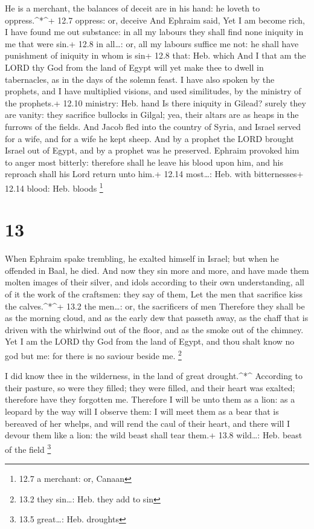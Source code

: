  He is a merchant, the balances of deceit are in his hand:
he loveth to oppress.\^{}*\^{}+ 12.7 oppress: or, deceive 
And Ephraim said, Yet I am become rich, I have found me out substance:
in all my labours they shall find none iniquity in me that were sin.+
12.8 in all\ldots: or, all my labours suffice me not: he shall have
punishment of iniquity in whom is sin+ 12.8 that: Heb. which
 And I that am the LORD thy God from the land of Egypt will
yet make thee to dwell in tabernacles, as in the days of the solemn
feast.  I have also spoken by the prophets, and I have
multiplied visions, and used similitudes, by the ministry of the
prophets.+ 12.10 ministry: Heb. hand  Is there iniquity in
Gilead? surely they are vanity: they sacrifice bullocks in Gilgal; yea,
their altars are as heaps in the furrows of the fields. 
And Jacob fled into the country of Syria, and Israel served for a wife,
and for a wife he kept sheep.  And by a prophet the LORD
brought Israel out of Egypt, and by a prophet was he preserved.
 Ephraim provoked him to anger most bitterly: therefore
shall he leave his blood upon him, and his reproach shall his Lord
return unto him.+ 12.14 most\ldots: Heb. with bitternesses+ 12.14 blood:
Heb. bloods \footnote{12.7 a merchant: or, Canaan}

\hypertarget{section-12}{%
\section{13}\label{section-12}}

 When Ephraim spake trembling, he exalted himself in Israel;
but when he offended in Baal, he died.  And now they sin
more and more, and have made them molten images of their silver, and
idols according to their own understanding, all of it the work of the
craftsmen: they say of them, Let the men that sacrifice kiss the
calves.\^{}*\^{}+ 13.2 the men\ldots: or, the sacrificers of men
 Therefore they shall be as the morning cloud, and as the
early dew that passeth away, as the chaff that is driven with the
whirlwind out of the floor, and as the smoke out of the chimney.
 Yet I am the LORD thy God from the land of Egypt, and thou
shalt know no god but me: for there is no saviour beside me. \footnote{13.2
  they sin\ldots: Heb. they add to sin}

 I did know thee in the wilderness, in the land of great
drought.\^{}*\^{}  According to their pasture, so were they
filled; they were filled, and their heart was exalted; therefore have
they forgotten me.  Therefore I will be unto them as a lion:
as a leopard by the way will I observe them:  I will meet
them as a bear that is bereaved of her whelps, and will rend the caul of
their heart, and there will I devour them like a lion: the wild beast
shall tear them.+ 13.8 wild\ldots: Heb. beast of the field \footnote{13.5
  great\ldots: Heb. droughts}


